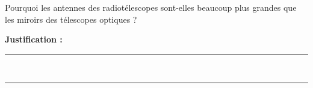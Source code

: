 Pourquoi les antennes des radiotélescopes sont-elles beaucoup plus grandes que les miroirs des télescopes optiques ?

\choices

\noindent\textbf{Justification :} \hrulefill \\[2.5ex]
\rule{\linewidth}{0.4pt} \\[2.5ex]
\rule{\linewidth}{0.4pt}
\vfill
